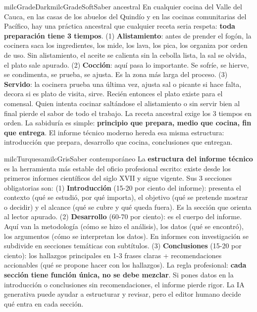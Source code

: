 \documentclass[11pt,letterpaper]{article}
\begin{document}
\begin{softbox}{milcGradeDark}{milcGradeSoft}{Saber ancestral}
En cualquier cocina del Valle del Cauca, en las casas de los abuelos del Quindío y en las cocinas comunitarias del Pacífico, hay una práctica ancestral que cualquier receta seria respeta: \textbf{toda preparación tiene 3 tiempos}. (1) \textbf{Alistamiento}: antes de prender el fogón, la cocinera saca los ingredientes, los mide, los lava, los pica, los organiza por orden de uso. Sin alistamiento, el aceite se calienta sin la cebolla lista, la sal se olvida, el plato sale apurado. (2) \textbf{Cocción}: aquí pasa lo importante. Se sofríe, se hierve, se condimenta, se prueba, se ajusta. Es la zona más larga del proceso. (3) \textbf{Servido}: la cocinera prueba una última vez, ajusta sal o picante si hace falta, decora si es plato de visita, sirve. Recién entonces el plato existe para el comensal. Quien intenta cocinar saltándose el alistamiento o sin servir bien al final pierde el sabor de todo el trabajo. La receta ancestral exige los 3 tiempos en orden. La sabiduría es simple: \textbf{principio que prepara, medio que cocina, fin que entrega}. El informe técnico moderno hereda esa misma estructura: introducción que prepara, desarrollo que cocina, conclusiones que entregan.
\end{softbox}

\begin{softbox}{milcTurquesa}{milcGris}{Saber contemporáneo}
La \textbf{estructura del informe técnico} es la herramienta más estable del oficio profesional escrito: existe desde los primeros informes científicos del siglo XVII y sigue vigente. Sus 3 secciones obligatorias son: (1) \textbf{Introducción} (15-20 por ciento del informe): presenta el contexto (qué se estudió, por qué importa), el objetivo (qué se pretende mostrar o decidir) y el alcance (qué se cubre y qué queda fuera). Es la sección que orienta al lector apurado. (2) \textbf{Desarrollo} (60-70 por ciento): es el cuerpo del informe. Aquí van la metodología (cómo se hizo el análisis), los datos (qué se encontró), los argumentos (cómo se interpretan los datos). En informes con investigación se subdivide en secciones temáticas con subtítulos. (3) \textbf{Conclusiones} (15-20 por ciento): los hallazgos principales en 1-3 frases claras + recomendaciones accionables (qué se propone hacer con los hallazgos). La regla profesional: \textbf{cada sección tiene función única, no se debe mezclar}. Si pones datos en la introducción o conclusiones sin recomendaciones, el informe pierde rigor. La IA generativa puede ayudar a estructurar y revisar, pero el editor humano decide qué entra en cada sección.
\end{softbox}
\end{document}
